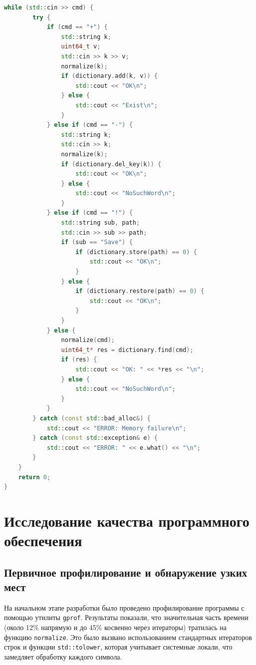 \documentclass[unicode, 12pt, a4paper,oneside,fleqn]{article}
\begin{document}
\begin{lstlisting}[language=C++]
    while (std::cin >> cmd) {
        try {
            if (cmd == "+") {
                std::string k;
                uint64_t v;
                std::cin >> k >> v;
                normalize(k);
                if (dictionary.add(k, v)) {
                    std::cout << "OK\n";
                } else {
                    std::cout << "Exist\n";
                }
            } else if (cmd == "-") {
                std::string k;
                std::cin >> k;
                normalize(k);
                if (dictionary.del_key(k)) {
                    std::cout << "OK\n";
                } else {
                    std::cout << "NoSuchWord\n";
                }
            } else if (cmd == "!") {
                std::string sub, path;
                std::cin >> sub >> path;
                if (sub == "Save") {
                    if (dictionary.store(path) == 0) {
                        std::cout << "OK\n";
                    }
                } else {
                    if (dictionary.restore(path) == 0) {
                        std::cout << "OK\n";
                    }
                }
            } else {
                normalize(cmd);
                uint64_t* res = dictionary.find(cmd);
                if (res) {
                    std::cout << "OK: " << *res << "\n";
                } else {
                    std::cout << "NoSuchWord\n";
                }
            }
        } catch (const std::bad_alloc&) {
            std::cout << "ERROR: Memory failure\n";
        } catch (const std::exception& e) {
            std::cout << "ERROR: " << e.what() << "\n";
        }
    }
    return 0;
}
\end{lstlisting}

\pagebreak

\section{Исследование качества программного обеспечения}

\subsection{Первичное профилирование и обнаружение узких мест}
На начальном этапе разработки было проведено профилирование программы с помощью утилиты \texttt{gprof}. Результаты показали, что значительная часть времени (около 12\% напрямую и до 45\% косвенно через итераторы) тратилась на функцию \texttt{normalize}. Это было вызвано использованием стандартных итераторов строк и функции \texttt{std::tolower}, которая учитывает системные локали, что замедляет обработку каждого символа.
\end{document}
